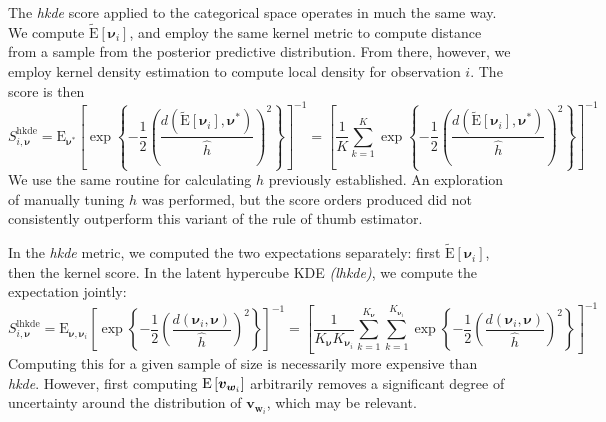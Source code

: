 The \emph{hkde} score applied to the categorical space operates in much the 
    same way.  We compute $\tilde{\text{E}}[\bm{\nu}_i]$, and employ the same 
    kernel metric to compute distance from a sample from the posterior predictive 
    distribution.  From there, however, we employ kernel density estimation
    to compute local density for observation $i$.  The score is then
    \begin{equation}
        \label{score:cat_hkde}
        S_{i,\bm{\nu}}^{\text{hkde}} = \text{E}_{\bm{\nu}^*}\left[
            \exp\left\lbrace
            -\frac{1}{2}\left(
            \frac{d(\tilde{\text{E}}[\bm{\nu}_i], \bm{\nu}^*)}{\hat{h}}
            \right)^2
            \right\rbrace
            \right]^{-1} = \left[\frac{1}{K}\sum_{k = 1}^{K}
                \exp\left\lbrace-\frac{1}{2}\left(
                \frac{d(\tilde{\text{E}}[\bm{\nu}_i],\bm{\nu}^*)}{\hat{h}}
                \right)^2\right\rbrace\right]^{-1}
    \end{equation}
We use the same routine for calculating $h$ previously established.  
    An exploration of manually tuning $h$ was performed, but the score orders 
    produced did not consistently outperform this variant of the rule of thumb 
    estimator.

In the \emph{hkde} metric, we computed the two expectations separately: first 
    $\tilde{\text{E}}[\bm{\nu}_i]$, then the kernel score.  In the latent hypercube 
    KDE \emph{(lhkde)}, we compute the expectation jointly:
    \begin{equation}
        \label{score:cat_lhkde}
        S_{i,\bm{\nu}}^{\text{lhkde}} = \text{E}_{\bm{\nu},\bm{\nu}_i}\left[
        \exp\left\lbrace
        -\frac{1}{2}\left(
        \frac{d(\bm{\nu}_i, \bm{\nu})}{\hat{h}}
        \right)^2
        \right\rbrace
        \right]^{-1} = \left[\frac{1}{K_{\bm{\nu}}K_{\bm{\nu}_i}}
            \sum_{k = 1}^{K_{\bm{\nu}}}\sum_{k = 1}^{K_{\bm{\nu}_i}}
            \exp\left\lbrace-\frac{1}{2}
                \left(\frac{d(\bm{\nu}_i,\bm{\nu})}{\hat{h}}\right)^2
                \right\rbrace\right]^{-1}
    \end{equation}
    Computing this for a given sample of size is necessarily more expensive 
    than \emph{hkde}.  However, first computing $\text{E}\left[\bm{v}_{\bm{w}_i}\right]$ 
    arbitrarily removes a significant degree of uncertainty around the 
    distribution of $\bm{v}_{\bm{w}_i}$, which may be relevant.

